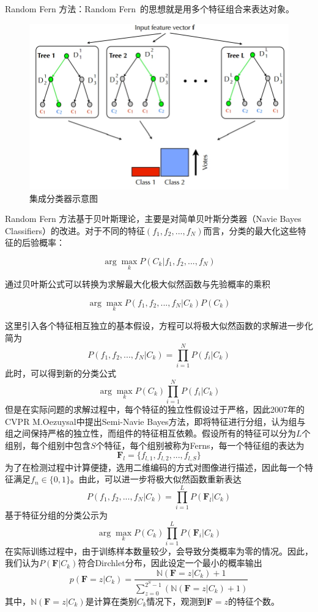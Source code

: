 Random Fern 方法：Random Fern 的思想就是用多个特征组合来表达对象。


\begin{figure}[htb]   
	\centering
	\includegraphics[width=\textwidth]{figs/161002_Thesis_Tracking_Section_05.pdf}
	\caption{集成分类器示意图}
	\label{fig:161002_Thesis_Tracking_Section_05}
\end{figure}

Random Fern 方法基于贝叶斯理论，主要是对简单贝叶斯分类器（Navie Bayes Classifiers）的改进。对于不同的特征$(f_1, f_2, ..., f_N)$而言，分类的最大化这些特征的后验概率：

$$\arg \max_{k}P(C_k|f_1, f_2, ..., f_N)$$

通过贝叶斯公式可以转换为求解最大化极大似然函数与先验概率的乘积

$$\arg \max_{k}P(f_1, f_2, ..., f_N|C_k)P(C_k)$$

这里引入各个特征相互独立的基本假设，方程可以将极大似然函数的求解进一步化简为
$$
P(f_1, f_2, ..., f_N|C_k)=\prod\limits_{i=1}^{N}P(f_i|C_k)
$$
此时，可以得到新的分类公式
$$
\arg\max_kP(C_k)\prod\limits_{i=1}^{N}P(f_i|C_k)
$$
但是在实际问题的求解过程中，每个特征的独立性假设过于严格，因此2007年的CVPR M.Oezuysal中提出Semi-Navie Bayes方法，即将特征进行分组，认为组与组之间保持严格的独立性，而组件的特征相互依赖。假设所有的特征可以分为$L$个组别，每个组别中包含$S$个特征，每个组别被称为Ferns，每一个特征组的表达为
$$
\mathbf{F}_l=\{f_{l,1}, f_{l,2},..., f_{l,S}\}
$$
为了在检测过程中计算便捷，选用二维编码的方式对图像进行描述，因此每一个特征满足$f_n\in\{{0,1}\}$。由此，可以进一步将极大似然函数重新表达
$$
P(f_1, f_2, ..., f_N|C_k)=\prod\limits_{i=1}^{L}P(\mathbf{F}_l|C_k)
$$
基于特征分组的分类公示为
$$
\arg\max_kP(C_k)\prod\limits_{i=1}^{L}P(\mathbf{F}_i|C_k)
$$
在实际训练过程中，由于训练样本数量较少，会导致分类概率为零的情况。因此，我们认为$P(\mathbf{F}|C_k)$符合Dirchlet分布，因此设定一个最小的概率输出
$$
p(\mathbf{F}=z|C_k)=\frac{\mathbb{N}(\mathbf{F}=z|C_k)+1}{\sum_{z=0}^{2^S-1}(\mathbb{N}(\mathbf{F}=z|C_k)+1)}
$$
其中，$\mathbb{N}(\mathbf{F}=z|C_k)$是计算在类别$C_k$情况下，观测到$\mathbf{F}=z$的特征个数。

